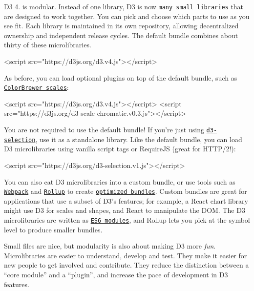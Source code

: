 D3 4. is modular. Instead of one library, D3 is now \href{#table-of-contents}{\tt many small libraries} that are designed to work together. You can pick and choose which parts to use as you see fit. Each library is maintained in its own repository, allowing decentralized ownership and independent release cycles. The default bundle combines about thirty of these microlibraries.


\begin{DoxyCode}
<script src="https://d3js.org/d3.v4.js"></script>
\end{DoxyCode}


As before, you can load optional plugins on top of the default bundle, such as \href{https://github.com/d3/d3-scale-chromatic}{\tt Color\+Brewer scales}\+:


\begin{DoxyCode}
<script src="https://d3js.org/d3.v4.js"></script>
<script src="https://d3js.org/d3-scale-chromatic.v0.3.js"></script>
\end{DoxyCode}


You are not required to use the default bundle! If you’re just using \href{https://github.com/d3/d3-selection}{\tt d3-\/selection}, use it as a standalone library. Like the default bundle, you can load D3 microlibraries using vanilla script tags or Require\+JS (great for H\+T\+T\+P/2!)\+:


\begin{DoxyCode}
<script src="https://d3js.org/d3-selection.v1.js"></script>
\end{DoxyCode}


You can also {\ttfamily cat} D3 microlibraries into a custom bundle, or use tools such as \href{https://webpack.github.io/}{\tt Webpack} and \href{http://rollupjs.org/}{\tt Rollup} to create \href{https://bl.ocks.org/mbostock/bb09af4c39c79cffcde4}{\tt optimized bundles}. Custom bundles are great for applications that use a subset of D3’s features; for example, a React chart library might use D3 for scales and shapes, and React to manipulate the D\+OM. The D3 microlibraries are written as \href{http://www.2ality.com/2014/09/es6-modules-final.html}{\tt E\+S6 modules}, and Rollup lets you pick at the symbol level to produce smaller bundles.

Small files are nice, but modularity is also about making D3 more {\itshape fun}. Microlibraries are easier to understand, develop and test. They make it easier for new people to get involved and contribute. They reduce the distinction between a “core module” and a “plugin”, and increase the pace of development in D3 features.

